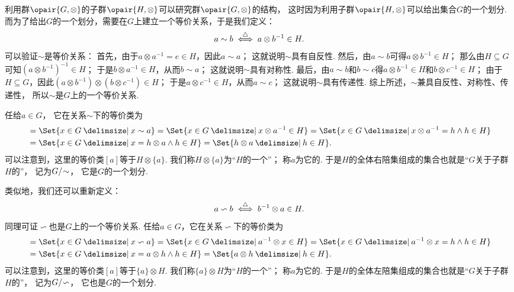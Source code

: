 利用群\(\opair{G,\otimes}\)的子群\(\opair{H,\otimes}\)可以研究群\(\opair{G,\otimes}\)的结构，
这时因为利用子群\(\opair{H,\otimes}\)可以给出集合\(G\)的一个划分.
而为了给出\(G\)的一个划分，需要在\(G\)上建立一个等价关系，于是我们定义：\[
	a \sim b
	\overset{\triangle}{\iff}
	a \otimes b^{-1} \in H.
\]
可以验证\(\sim\)是等价关系：
首先，由于\(a \otimes a^{-1} = e \in H\)，因此\(a \sim a\)；
这就说明\(\sim\)具有自反性.
然后，由\(a \sim b\)可得\(a \otimes b^{-1} \in H\)；
那么由\(H \subseteq G\)可知\((a \otimes b^{-1})^{-1} \in H\)；
于是\(b \otimes a^{-1} \in H\)，从而\(b \sim a\)；
这就说明\(\sim\)具有对称性.
最后，由\(a \sim b\)和\(b \sim c\)得\(a \otimes b^{-1} \in H\)和\(b \otimes c^{-1} \in H\)；
由于\(H \subseteq G\)，因此\((a \otimes b^{-1}) \otimes (b \otimes c^{-1}) \in H\)；
于是\(a \otimes c^{-1} \in H\)，从而\(a \sim c\)；
这就说明\(\sim\)具有传递性.
综上所述，\(\sim\)兼具自反性、对称性、传递性，
所以\(\sim\)是\(G\)上的一个等价关系.

任给\(a \in G\)，
它在关系\(\sim\)下的等价类为\begin{align*}
	[a] &= \Set{ x \in G \given x \sim a }
	= \Set{ x \in G \given x \otimes a^{-1} \in H }
	= \Set{ x \in G \given x \otimes a^{-1} = h \land h \in H } \\
	&= \Set{ x \in G \given x = h \otimes a \land h \in H }
	= \Set{ h \otimes a \given h \in H }.
\end{align*}
可以注意到，这里的等价类\([a]\)等于\(H \otimes \{a\}\).
我们称\(H \otimes \{a\}\)为“\(H\)的一个”；
称\(a\)为它的.
于是\(H\)的全体右陪集组成的集合也就是“\(G\)关于子群\(H\)的”，
记为\(G/\kern-2pt\sim\)，
它是\(G\)的一个划分.

类似地，我们还可以重新定义：\[
	a \backsim b
	\overset{\triangle}{\iff}
	b^{-1} \otimes a \in H.
\]
同理可证\(\backsim\)也是\(G\)上的一个等价关系.
任给\(a \in G\)，它在关系\(\backsim\)下的等价类为\begin{align*}
	[a] &= \Set{ x \in G \given x \backsim a }
	= \Set{ x \in G \given a^{-1} \otimes x \in H }
	= \Set{ x \in G \given a^{-1} \otimes x = h \land h \in H } \\
	&= \Set{ x \in G \given x = a \otimes h \land h \in H }
	= \Set{ a \otimes h \given h \in H }.
\end{align*}
可以注意到，这里的等价类\([a]\)等于\(\{a\} \otimes H\).
我们称\(\{a\} \otimes H\)为“\(H\)的一个”；
称\(a\)为它的.
于是\(H\)的全体左陪集组成的集合也就是“\(G\)关于子群\(H\)的”，
记为\(G/\kern-2pt\backsim\)，
它也是\(G\)的一个划分.

